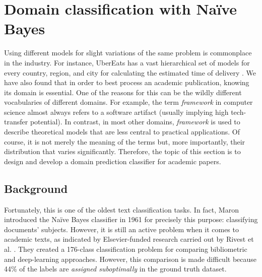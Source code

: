 \section{Domain classification with Naïve Bayes} \label{section:simple-case}

Using different models for slight variations of the same problem is commonplace in the industry. For instance, UberEats has a vast hierarchical set of models for every country, region, and city for calculating the estimated time of delivery \cite{li2017scaling}. We have also found that in order to best process an academic publication, knowing its domain is essential. One of the reasons for this can be the wildly different vocabularies of different domains. For example, the term \textit{framework} in computer science almost always refers to a software artifact (usually implying high tech-transfer potential). In contrast, in most other domains, \textit{framework} is used to describe theoretical models that are less central to practical applications. Of course, it is not merely the meaning of the terms but, more importantly, their distribution that varies significantly. Therefore, the topic of this section is to design and develop a domain prediction classifier for academic papers.

\subsection{Background}

Fortunately, this is one of the oldest text classification tasks. In fact, Maron introduced the Naïve Bayes classifier in 1961 \cite{maron1961automatic} for precisely this purpose: classifying documents' subjects. However, it is still an active problem when it comes to academic texts, as indicated by Elsevier-funded research carried out by Rivest et al. \cite{rivest2021level}. They created a 176-class classification problem for comparing bibliometric and deep-learning approaches. However, this comparison is made difficult because 44\% of the labels are \textit{assigned suboptimally} in the ground truth dataset.

